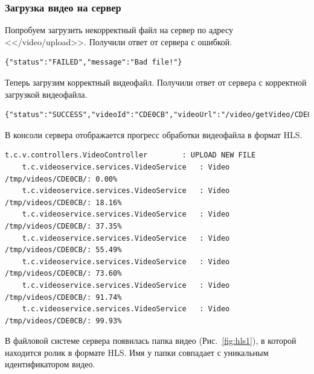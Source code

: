 \documentclass{../../includes/TechDocMultiAuthors}
\begin{document}
    \subsubsection{Загрузка видео на сервер}

    Попробуем загрузить некорректный файл на сервер по адресу <</video/upload>>.
    Получили ответ от сервера с ошибкой.

    \begin{lstlisting}[language=text,caption={Ответ сервера при загрузке некорректного файла}]
    {"status":"FAILED","message":"Bad file!"}
    \end{lstlisting}

    Теперь загрузим корректный видеофайл.
    Получили ответ от сервера с корректной загрузкой видеофайла.

    \begin{lstlisting}[language=text,caption={Ответ сервера при загрузке корректного файла}]
    {"status":"SUCCESS","videoId":"CDE0CB","videoUrl":"/video/getVideo/CDE0CB/video.m3u8"}
    \end{lstlisting}

    В консоли сервера отображается прогресс обработки видеофайла в формат HLS.

    \begin{lstlisting}[language=text,caption={Информация об обработке файла в консоли}]
    t.c.v.controllers.VideoController        : UPLOAD NEW FILE
    t.c.videoservice.services.VideoService   : Video /tmp/videos/CDE0CB/: 0.00%
    t.c.videoservice.services.VideoService   : Video /tmp/videos/CDE0CB/: 18.16%
    t.c.videoservice.services.VideoService   : Video /tmp/videos/CDE0CB/: 37.35%
    t.c.videoservice.services.VideoService   : Video /tmp/videos/CDE0CB/: 55.49%
    t.c.videoservice.services.VideoService   : Video /tmp/videos/CDE0CB/: 73.60%
    t.c.videoservice.services.VideoService   : Video /tmp/videos/CDE0CB/: 91.74%
    t.c.videoservice.services.VideoService   : Video /tmp/videos/CDE0CB/: 99.93%
    \end{lstlisting}

    В файловой системе сервера появилась папка видео (Рис.~\ref{fig:hls1}), в которой находится ролик в формате HLS.
    Имя у папки совпадает с уникальным идентификатором видео.
\end{document}
